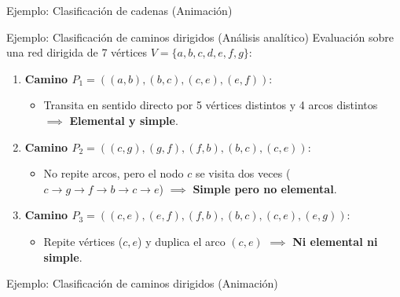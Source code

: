 \documentclass[
  ignorenonframetext,
]{beamer}
\providecommand{\tightlist}{%
  \setlength{\itemsep}{0pt}\setlength{\parskip}{0pt}}
\begin{document}
\begin{frame}{Ejemplo: Clasificación de cadenas (Animación)}
\label{ejemplo-clasificaciuxf3n-de-cadenas-animaciuxf3n}
\end{frame}

\begin{frame}{Ejemplo: Clasificación de caminos dirigidos (Análisis
analítico)}
\label{ejemplo-clasificaciuxf3n-de-caminos-dirigidos-anuxe1lisis-analuxedtico}
Evaluación sobre una red dirigida de 7 vértices
\(V = \{a, b, c, d, e, f, g\}\):

\begin{enumerate}
\tightlist
\item
  \textbf{Camino \(P_1 = ((a,b), (b,c), (c,e), (e,f))\)}:

  \begin{itemize}
  \tightlist
  \item
    Transita en sentido directo por 5 vértices distintos y 4 arcos
    distintos \(\implies\) \textbf{Elemental y simple}.
  \end{itemize}
\item
  \textbf{Camino \(P_2 = ((c,g), (g,f), (f,b), (b,c), (c,e))\)}:

  \begin{itemize}
  \tightlist
  \item
    No repite arcos, pero el nodo \(c\) se visita dos veces
    (\(c \to g \to f \to b \to c \to e\)) \(\implies\) \textbf{Simple
    pero no elemental}.
  \end{itemize}
\item
  \textbf{Camino \(P_3 = ((c,e), (e,f), (f,b), (b,c), (c,e), (e,g))\)}:

  \begin{itemize}
  \tightlist
  \item
    Repite vértices (\(c, e\)) y duplica el arco \((c,e)\) \(\implies\)
    \textbf{Ni elemental ni simple}.
  \end{itemize}
\end{enumerate}
\end{frame}

\begin{frame}{Ejemplo: Clasificación de caminos dirigidos (Animación)}
\label{ejemplo-clasificaciuxf3n-de-caminos-dirigidos-animaciuxf3n}
\end{frame}
\end{document}

